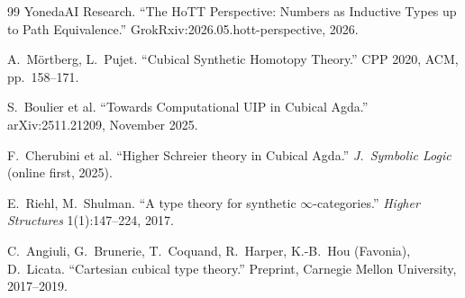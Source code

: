 \documentclass[12pt]{article}
\theoremstyle{definition}
\theoremstyle{remark}
\begin{document}
\begin{thebibliography}{99}
YonedaAI Research.
``The HoTT Perspective: Numbers as Inductive Types up to Path Equivalence.''
GrokRxiv:2026.05.hott-perspective, 2026.

A.~M{\"o}rtberg, L.~Pujet.
``Cubical Synthetic Homotopy Theory.''
CPP 2020, ACM, pp.~158--171.

S.~Boulier et al.
``Towards Computational UIP in Cubical Agda.''
arXiv:2511.21209, November 2025.

F.~Cherubini et al.
``Higher Schreier theory in Cubical Agda.''
\emph{J.\ Symbolic Logic} (online first, 2025).

E.~Riehl, M.~Shulman.
``A type theory for synthetic $\infty$-categories.''
\emph{Higher Structures} 1(1):147--224, 2017.

C.~Angiuli, G.~Brunerie, T.~Coquand, R.~Harper, K.-B.~Hou (Favonia),
D.~Licata.
``Cartesian cubical type theory.''
Preprint, Carnegie Mellon University, 2017--2019.

\end{thebibliography}
\end{document}
